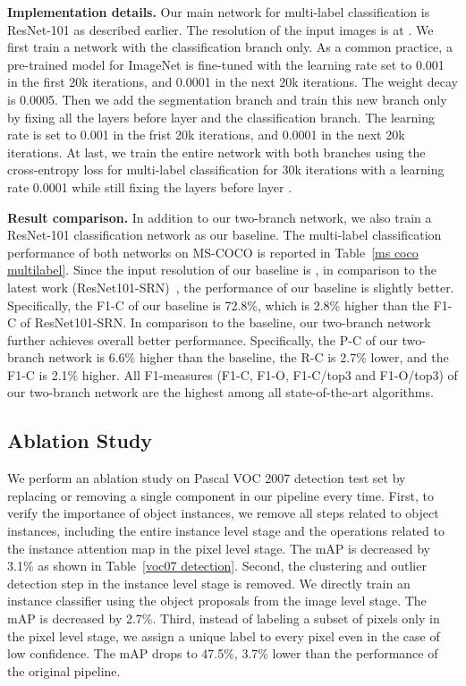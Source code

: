 \documentclass[10pt,twocolumn,letterpaper]{article}
\begin{document}
\noindent\textbf{Implementation details.} Our main network for multi-label classification is ResNet-101 as described earlier. The resolution of the input images is at . We first train a network with the classification branch only. As a common practice, a pre-trained model for ImageNet is fine-tuned with the learning rate  set to 0.001 in the first 20k iterations, and 0.0001 in the next 20k iterations. The weight decay is 0.0005. Then we add the segmentation branch and train this new branch only by fixing all the layers before layer  and the classification branch. The learning rate is set to 0.001 in the frist 20k iterations, and 0.0001 in the next 20k iterations. At last, we train the entire network with both branches using the cross-entropy loss for multi-label classification for 30k iterations with a learning rate 0.0001 while still fixing the layers before layer .

\noindent\textbf{Result comparison.}  In addition to our two-branch network, we also train a ResNet-101 classification network as our baseline. The multi-label classification performance of both networks on MS-COCO is reported in Table~\ref{ms coco multilabel}. Since the input resolution of our baseline is , in comparison to the latest work (ResNet101-SRN)~\cite{zhu2017learning}, the performance of our baseline is slightly better. Specifically, the F1-C of our baseline is 72.8\%, which is 2.8\% higher than the F1-C of ResNet101-SRN.
In comparison to the baseline, our two-branch network further achieves overall better performance. Specifically, the P-C of our two-branch network is 6.6\% higher than the baseline, the R-C is 2.7\% lower, and the F1-C is 2.1\% higher. All F1-measures (F1-C, F1-O, F1-C/top3 and F1-O/top3) of our two-branch network are the highest among all state-of-the-art algorithms.


\subsection{Ablation Study}
We perform an ablation study on Pascal VOC 2007 detection test set by replacing or removing a single component in our pipeline every time. First, to verify the importance of object instances, we remove all steps related to object instances, including the entire instance level stage and the operations related to the instance attention map in the pixel level stage. The mAP is decreased by 3.1\% as shown in Table~\ref{voc07 detection}. Second, the clustering and outlier detection step in the instance level stage is removed. We directly train an instance classifier using the object proposals from the image level stage. The mAP is decreased by 2.7\%. Third, instead of labeling a subset of pixels only in the pixel level stage, we assign a unique label to every pixel even in the case of low confidence. The mAP drops to 47.5\%, 3.7\% lower than the performance of the original pipeline.
\end{document}
